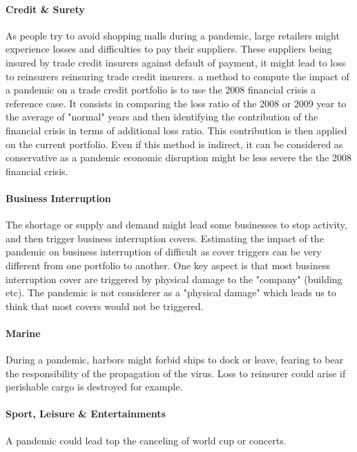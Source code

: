 \paragraph{Credit \& Surety}

As people try to avoid shopping malls during a pandemic, large retailers might experience losses and difficulties to pay their suppliers. These suppliers being insured by trade credit insurers against default of payment, it might lead to loss to reinsurers reinsuring trade credit insurers. a method to compute the impact of a pandemic on a trade credit portfolio is to use the 2008 financial crisis a reference case. It consists in comparing the loss ratio of the 2008 or 2009 year to the average of "normal" years and then identifying the contribution of the financial crisis in terms of additional loss ratio. This contribution is then applied on the current portfolio. Even if this method is indirect, it can be considered as conservative as a pandemic economic disruption might be less severe the the 2008 financial crisis.

\paragraph{Business Interruption}

The shortage or supply and demand might lead some businesses to stop activity, and then trigger business interruption covers. Estimating the impact of the pandemic on business interruption of difficult as cover triggers can be very different from one portfolio to another. One key aspect is that most business interruption cover are triggered by physical damage to the "company" (building etc). The pandemic is not considerer as a "physical damage" which leads us to think that most covers would not be triggered.


\paragraph{Marine}

During a pandemic, harbors might forbid ships to dock or leave, fearing to bear the responsibility of the propagation of the virus. Loss to reinsurer could arise if perishable cargo is destroyed for example.

\paragraph{Sport, Leisure \& Entertainments}

A pandemic could lead top the canceling of world cup or concerts.
